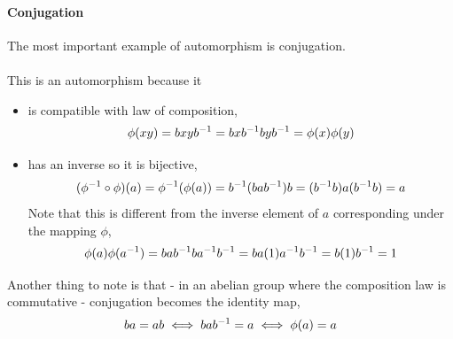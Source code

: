 \documentclass[MathsNotesBase.tex]{subfiles}
\begin{document}
{		\paragraph{Conjugation}
		The most important example of automorphism is conjugation.\\\\
		This is an automorphism because it
		\begin{itemize}
			\item{is compatible with law of composition, 
				\[ \phi(xy) = bxy{b}^{-1} = bx{b}^{-1}by{b}^{-1} = \phi(x)\phi(y) \]
			}
			\item{has an inverse so it is bijective, 
				\[ ({\phi}^{-1} \circ \phi)(a) = {\phi}^{-1}(\phi(a)) = {b}^{-1}(ba{b}^{-1})b = ({b}^{-1}b)a({b}^{-1}b) = a \]
				Note that this is different from the inverse element of $a$ corresponding under the mapping $\phi$,
				\[ \phi(a)\phi({a}^{-1}) = ba{b}^{-1}b{a}^{-1}{b}^{-1} = ba(1){a}^{-1}{b}^{-1} = b(1){b}^{-1} = 1 \]
			}
		\end{itemize}
		Another thing to note is that - in an abelian group where the composition law is commutative - conjugation becomes the identity map,
		\[ ba = ab \iff ba{b}^{-1} = a \iff \phi(a) = a \]
	}
\end{document}
